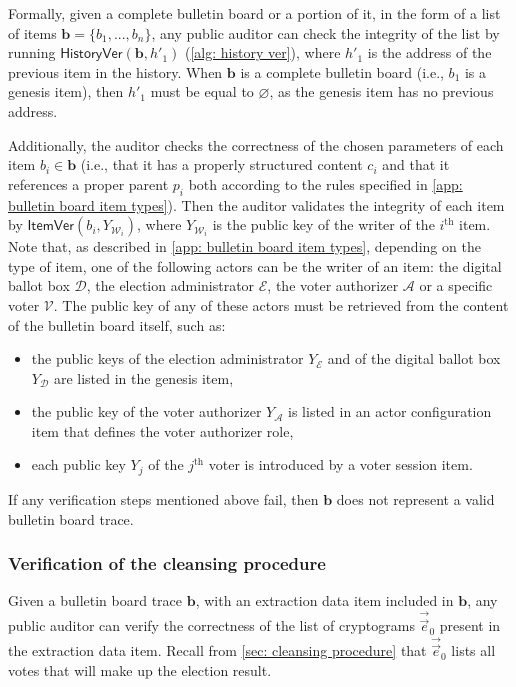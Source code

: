 Formally, given a complete bulletin board or a portion of it, in the form of a list of items $\boldsymbol{b} = \{ b_1, ..., b_n \}$, any public auditor can check the integrity of the list by running $\mathsf{HistoryVer} (\boldsymbol{b}, h'_1)$ (\cref{alg: history ver}), where $h'_1$ is the address of the previous item in the history. When $\boldsymbol{b}$ is a complete bulletin board (i.e., $b_1$ is a genesis item), then $h'_1$ must be equal to $\varnothing$, as the genesis item has no previous address.

Additionally, the auditor checks the correctness of the chosen parameters of each item $b_i \in \boldsymbol{b}$ (i.e., that it has a properly structured content $c_i$ and that it references a proper parent $p_i$ both according to the rules specified in \cref{app: bulletin board item types}). Then the auditor validates the integrity of each item by $\mathsf{ItemVer} (b_i, Y_{\mathcal{W}_i})$, where $Y_{\mathcal{W}_i}$ is the public key of the writer of the $i^\mathrm{th}$ item. Note that, as described in \cref{app: bulletin board item types}, depending on the type of item, one of the following actors can be the writer of an item: the digital ballot box $\mathcal{D}$, the election administrator $\mathcal{E}$, the voter authorizer $\mathcal{A}$ or a specific voter $\mathcal{V}$. The public key of any of these actors must be retrieved from the content of the bulletin board itself, such as:
\begin{itemize}
    \item the public keys of the election administrator $Y_\mathcal{E}$ and of the digital ballot box $Y_\mathcal{D}$ are listed in the genesis item,
    \item the public key of the voter authorizer $Y_\mathcal{A}$ is listed in an actor configuration item that defines the voter authorizer role,
    \item each public key $Y_j$ of the $j^\mathrm{th}$ voter is introduced by a voter session item.
\end{itemize}

If any verification steps mentioned above fail, then $\boldsymbol{b}$ does not represent a valid bulletin board trace.


\subsubsection{Verification of the cleansing procedure} \label{sec: verification of the cleansing procedure}
Given a bulletin board trace $\boldsymbol{b}$, with an extraction data item included in $\boldsymbol{b}$, any public auditor can verify the correctness of the list of cryptograms $\vec{\vec{e}}_0$ present in the extraction data item. Recall from \cref{sec: cleansing procedure} that $\vec{\vec{e}}_0$ lists all votes that will make up the election result.

